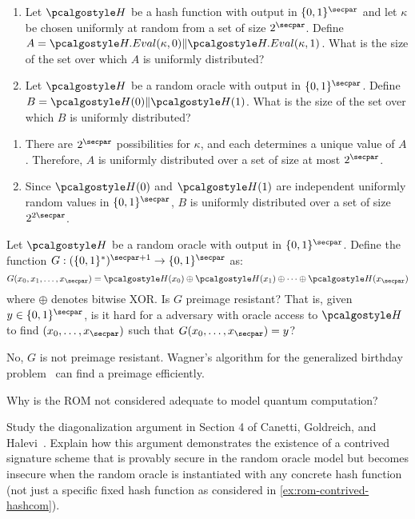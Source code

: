 \begin{exercise}[Optional]
  \begin{enumerate}
    \item Let $\algo{H}$ be a hash function with output in $\{0,1\}^\secpar$ and let $\kappa$ be chosen uniformly at random from a set of size $2^\secpar$. Define $A = \algo{H.Eval}(\kappa, 0) \| \algo{H.Eval}(\kappa, 1)$. What is the size of the set over which $A$ is uniformly distributed?
    \item Let $\algo{H}$ be a random oracle with output in $\{0,1\}^\secpar$. Define $B = \algo{H}(0) \| \algo{H}(1)$. What is the size of the set over which $B$ is uniformly distributed?
  \end{enumerate}
\end{exercise}

\ifsolutions
\begin{mysolution}
  \begin{enumerate}
    \item There are $2^\secpar$ possibilities for $\kappa$, and each determines a unique value of $A$. Therefore, $A$ is uniformly distributed over a set of size at most $2^\secpar$.
    \item Since $\algo{H}(0)$ and $\algo{H}(1)$ are independent uniformly random values in $\{0,1\}^\secpar$, $B$ is uniformly distributed over a set of size $2^{2\secpar}$.
  \end{enumerate}
\end{mysolution}
\fi

\begin{exercise}[Optional]
  Let $\algo{H}$ be a random oracle with output in $\{0,1\}^\secpar$. Define the function $G: (\{0,1\}^*)^{\secpar+1} \rightarrow \{0,1\}^\secpar$ as:
  \[
  G(x_0, x_1, \ldots, x_\secpar) = \algo{H}(x_0) \oplus \algo{H}(x_1) \oplus \cdots \oplus \algo{H}(x_\secpar)
  \]
  where $\oplus$ denotes bitwise XOR. Is $G$ preimage resistant? That is, given $y \in \{0,1\}^\secpar$, is it hard for a \ppt adversary with oracle access to $\algo{H}$ to find $(x_0, \ldots, x_\secpar)$ such that $G(x_0, \ldots, x_\secpar) = y$?
\end{exercise}

\ifsolutions
\begin{mysolution}
  No, $G$ is not preimage resistant. Wagner's algorithm for the generalized birthday problem~\cite{C:Wagner02} can find a preimage efficiently.
\end{mysolution}
\fi

\begin{exercise}[Optional]
  Why is the ROM not considered adequate to model quantum computation?
\end{exercise}

\begin{exercise}[Optional]
  Study the diagonalization argument in Section 4 of Canetti, Goldreich, and Halevi~\cite{STOC:CanGolHal98}.
  Explain how this argument demonstrates the existence of a contrived signature scheme that is provably secure in the random oracle model but becomes insecure when the random oracle is instantiated with any concrete hash function (not just a specific fixed hash function as considered in \autoref{ex:rom-contrived-hashcom}).
\end{exercise}
